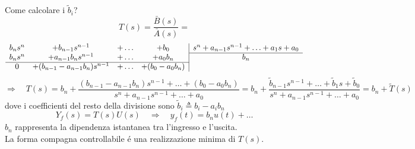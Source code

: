 \documentclass[../main.tex]{subfiles}
\begin{document}
		Come calcolare i $ \tilde b_i $?
		\[
			T(s) = \dfrac{\bar B(s)}{\bar A(s)} =
		\]
		\[
			\begin{array}{cccc|c}
				b_n s^n & +b_{n-1} s^{n-1} & +\dots & +b_0 & s^n + a_{n-1} s^{n-1} + \ldots + a_1 s + a_0
				\\\cline{5-5}
				b_n s^n & +a_{n-1} b_n s^{n-1} & +\dots & +a_0 b_n & b_n
				\\\cline{1-4}
				0 & +(b_{n-1} - a_{n-1} b_n) s^{n-1} & +\dots & +(b_0 - a_0 b_n)
			\end{array}
		\]
		\newline
		\[
			\Rightarrow\quad T(s) = b_n + \dfrac{(b_{n-1} - a_{n-1} b_n)s^{n-1} + \dots + (b_0 - a_0 b_n)}{s^n + a_{n-1} s^{n-1} + \dots + a_0} = b_n + \dfrac{\tilde b_{n-1} s^{n-1} + \dots + \tilde b_1 s + \tilde b_0}{s^n + a_{n-1} s^{n-1} + \dots + a_0} = b_n + \tilde T(s)
		\]
		dove i coefficienti del resto della divisione sono $ \tilde b_i \triangleq b_i - a_i b_n $
		\[
			Y_f(s) = T(s) U(s) \quad\Rightarrow\quad y_f(t) = b_n u(t) + \ldots
		\]
		$ b_n $ rappresenta la dipendenza istantanea tra l'ingresso e l'uscita.\\
		\newline
		La forma compagna controllabile \'e una realizzazione minima di $ T(s) $.
		
\end{document}
